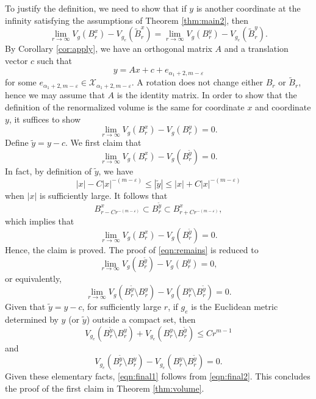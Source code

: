 \documentclass{amsart}
\newcommand{\abs}[1]{\left\vert#1\right\vert}
\numberwithin{equation}{section}
\begin{document}
To justify the definition, we need to show that if $y$ is another coordinate at the infinity satisfying the assumptions of Theorem \ref{thm:main2}, then
\begin{equation}
	\label{eqn:volume}
	\lim_{r\to \infty } V_g(B_r^x)-V_{g_e}(\tilde{B}_r^x) = \lim_{r \to \infty } V_g(B_r^y)-V_{g_e}(\tilde{B}_r^y).
\end{equation}
By Corollary \ref{cor:apply}, we have an orthogonal matrix $A$ and a translation vector $c$ such that
\[
	y=A x + c + e_{\alpha_1+2,m-\varepsilon}
\]
for some $e_{\alpha_1+2,m-\varepsilon}\in \mathcal X_{\alpha_1+2,m-\varepsilon}$. A rotation does not change either $B_r$ or $\tilde{B}_r$, hence we may assume that $A$ is the identity matrix. In order to show that the definition of the renormalized volume is the same for coordinate $x$ and coordinate $y$, it suffices to show
\begin{equation}
	\label{eqn:remains}
	\lim_{r\to \infty } V_g(B_r^x) - V_g(B_r^y)=0.
\end{equation}
Define $\tilde{y}=y-c$. We first claim that
\[
	\lim_{r\to \infty } V_g(B_r^x) - V_g(B_r^{\tilde{y}})=0.
\]
In fact, by definition of $\tilde{y}$, we have
\[
	\abs{x}-C \abs{x}^{-(m-\varepsilon)} \leq \abs{\tilde{y}}\leq \abs{x}+C \abs{x}^{-(m-\varepsilon)}
\]
when $\abs{x}$ is sufficiently large. It follows that
\[
	B^x_{r-Cr^{-(m-\varepsilon)}}\subset B^{\tilde{y}}_r \subset B^x_{r+C r^{-(m-\varepsilon)}},
\]
which implies that 
\[
	\lim_{r\to \infty } V_g(B_r^x)-V_g(B_r^{\tilde y})=0.
\]
Hence, the claim is proved. The proof of \eqref{eqn:remains} is reduced to
\[
	\lim_{r\to \infty } V_g(B_r^{\tilde{y}})-V_g(B_r^y)=0,
\]
or equivalently,
\begin{equation}
	\label{eqn:final1}
	\lim_{r\to \infty } V_g(B_r^{\tilde{y}}\setminus B_r^y)-V_g(B_r^y\setminus B_r^{\tilde{y}})=0.
\end{equation}
Given that $\tilde{y}=y-c$, for sufficiently large $r$, if $g_e$ is the Euclidean metric determined by $y$ (or $\tilde{y}$) outside a compact set, then
\[
	V_{g_e}(B_r^{\tilde{y}} \setminus  B_r^y) + V_{g_e}(B_r^y \setminus B_r^{\tilde{y}}) \leq C r^{m-1}
\]
and
\[
	V_{g_e}(B_r^{\tilde{y}}\setminus B_r^y)-V_{g_e}(B_r^y\setminus B_r^{\tilde{y}})=0.
\]
Given these elementary facts, \eqref{eqn:final1} follows from \eqref{eqn:final2}. This concludes the proof of the first claim in Theorem \ref{thm:volume}.
\end{document}
